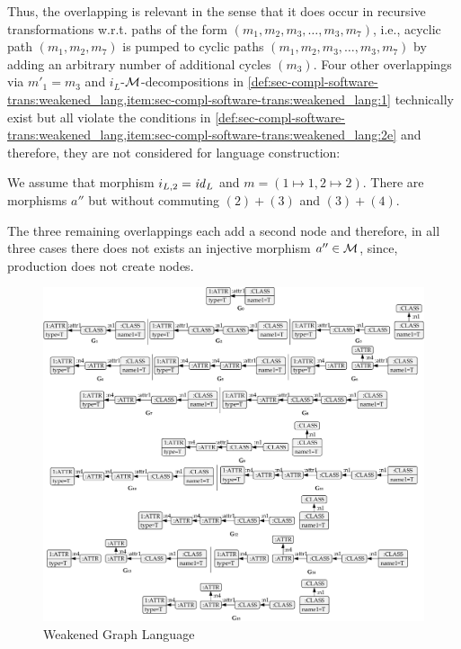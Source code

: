 \begin{example}
Thus, the overlapping is relevant in the sense that it does occur in recursive transformations w.r.t. paths of the form $(m_1,m_2,m_3,\ldots,m_3,m_7)$, i.e., acyclic path $(m_1,m_2,m_7)$ is pumped to cyclic paths $(m_1,m_2,m_3,\ldots,m_3,m_7)$ by adding an arbitrary number of additional cycles $(m_3)$.
Four other overlappings via $m'_1=m_3$ and $i_L$-${\cal M}$-decompositions in \cref{def:sec-compl-software-trans:weakened_lang,item:sec-compl-software-trans:weakened_lang:1} technically exist but all violate the conditions in \cref{def:sec-compl-software-trans:weakened_lang,item:sec-compl-software-trans:weakened_lang:2e} and therefore, they are not considered for language construction:
\begin{enumerate*}
\item We assume that morphism $i_{L,2}=\mathit{id}_L$ and $m=(1 \mapsto 1,2 \mapsto 2)$.
There are morphisms $a''$ but without commuting $(2)+(3)$ and $(3)+(4)$.
\item The three remaining overlappings each add a second  node and therefore, in all three cases there does not exists an injective morphism $a'' \in {\cal M}$, since, production  does not create  nodes.
\envEndMarker
\end{enumerate*}
\begin{figure}[!tb]
\begin{center}
  \includegraphics[width=\textwidth]{img/software_trans/wlex.pdf}
\end{center}
\caption{Weakened Graph Language}
\label{fig:sec-compl-software-trans:wglex}
\end{figure}
\end{example}

